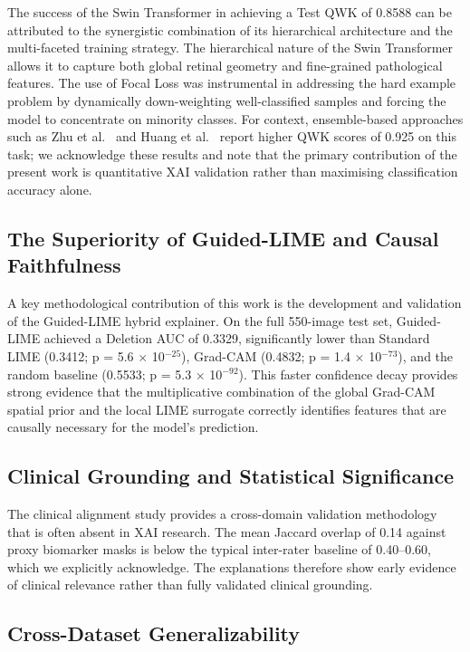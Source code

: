 \documentclass[10pt,twoside]{article}
\begin{document}
The success of the Swin Transformer in achieving a Test QWK of 0.8588 can be attributed to the synergistic combination of its hierarchical architecture and the multi-faceted training strategy. The hierarchical nature of the Swin Transformer allows it to capture both global retinal geometry and fine-grained pathological features. The use of Focal Loss was instrumental in addressing the hard example problem by dynamically down-weighting well-classified samples and forcing the model to concentrate on minority classes. For context, ensemble-based approaches such as Zhu et al.~\cite{zhu2024nnmobilenet} and Huang et al.~\cite{huang2024ssit} report higher QWK scores of 0.925 on this task; we acknowledge these results and note that the primary contribution of the present work is quantitative XAI validation rather than maximising classification accuracy alone.

\subsection{The Superiority of Guided-LIME and Causal Faithfulness}

A key methodological contribution of this work is the development and validation of the Guided-LIME hybrid explainer. On the full 550-image test set, Guided-LIME achieved a Deletion AUC of 0.3329, significantly lower than Standard LIME (0.3412; p = 5.6 $\times$ 10$^{-25}$), Grad-CAM (0.4832; p = 1.4 $\times$ 10$^{-73}$), and the random baseline (0.5533; p = 5.3 $\times$ 10$^{-92}$). This faster confidence decay provides strong evidence that the multiplicative combination of the global Grad-CAM spatial prior and the local LIME surrogate correctly identifies features that are causally necessary for the model's prediction.

\subsection{Clinical Grounding and Statistical Significance}

The clinical alignment study provides a cross-domain validation methodology that is often absent in XAI research. The mean Jaccard overlap of 0.14 against proxy biomarker masks is below the typical inter-rater baseline of 0.40--0.60, which we explicitly acknowledge. The explanations therefore show early evidence of clinical relevance rather than fully validated clinical grounding.

\subsection{Cross-Dataset Generalizability}
\end{document}
